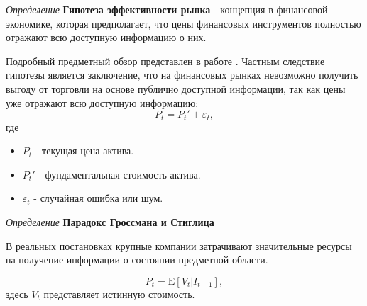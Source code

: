 \textit{Определение} \textbf{Гипотеза эффективности рынка} -  концепция в финансовой экономике,
 которая предполагает, что цены финансовых инструментов полностью отражают всю доступную информацию о них. 

Подробный предметный обзор представлен в работе \cite{архипов2007предпосылки}. 
Частным следствие гипотезы является заключение, что на финансовых рынках невозможно получить выгоду от торговли на основе публично доступной информации, 
так как цены уже отражают всю доступную информацию:
\begin{equation}
     P_t = P_t' + \varepsilon_t,
\end{equation}
где \begin{itemize}
    \item \( P_t \) - текущая цена актива.
    \item \( P_t' \) - фундаментальная стоимость актива.
    \item \( \varepsilon_t \) - случайная ошибка или шум.
\end{itemize}



\textit{Определение} \textbf{Парадокс Гроссмана и Стиглица} \cite{grossman1980impossibility}



В реальных постановках крупные компании затрачивают значительные ресурсы на получение информации о состоянии предметной области.

\begin{equation}
    P_t = \mathrm{E}[V_t|I_{t-1}],
\end{equation}
здесь $V_t$ представляет истинную стоимость.


